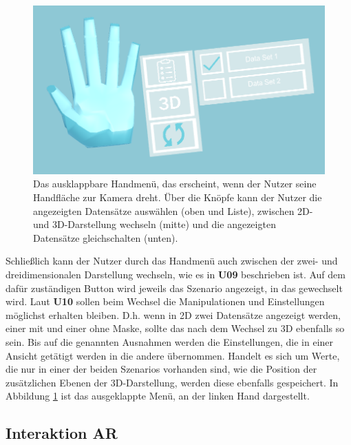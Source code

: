  \begin{figure}[!htb]
	\centering
	\includegraphics[width=0.7\linewidth]{images/handUI_2.png}
	\caption{Das ausklappbare Handmenü, das erscheint, wenn der Nutzer seine Handfläche zur Kamera dreht. Über die Knöpfe kann der Nutzer die angezeigten Datensätze auswählen (oben und Liste), zwischen 2D- und 3D-Darstellung wechseln (mitte) und die angezeigten Datensätze gleichschalten (unten). }
	\label{img:handUI}
\end{figure}
\FloatBarrier

Schließlich kann der Nutzer durch das Handmenü auch zwischen der zwei- und dreidimensionalen Darstellung wechseln, wie es in \textbf{U09} beschrieben ist. Auf dem dafür zuständigen Button wird jeweils das Szenario angezeigt, in das gewechselt wird.
Laut \textbf{U10} sollen beim Wechsel die Manipulationen und Einstellungen möglichst erhalten bleiben. D.h. wenn in 2D zwei Datensätze angezeigt werden, einer mit und einer ohne Maske, sollte das nach dem Wechsel zu 3D ebenfalls so sein. 
Bis auf die genannten Ausnahmen werden die Einstellungen, die in einer Ansicht getätigt werden in die andere übernommen. Handelt es sich um Werte, die nur in einer der beiden Szenarios vorhanden sind, wie die Position der zusätzlichen Ebenen der 3D-Darstellung, werden diese ebenfalls gespeichert.
In Abbildung \ref{img:handUI} ist das ausgeklappte Menü, an der linken Hand dargestellt.


\subsection{Interaktion AR}


